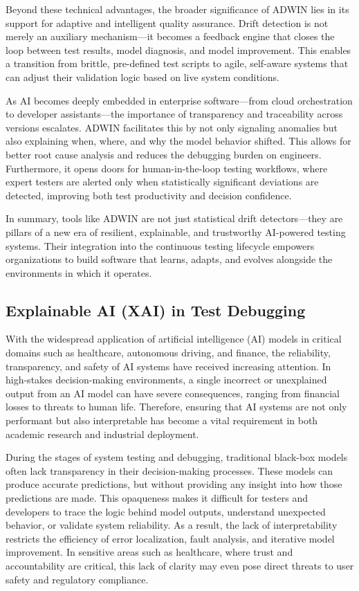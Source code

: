 \documentclass[manuscript,screen,review]{acmart}
\begin{document}
Beyond these technical advantages, the broader significance of ADWIN lies in its support for adaptive and intelligent quality assurance. Drift detection is not merely an auxiliary mechanism---it becomes a feedback engine that closes the loop between test results, model diagnosis, and model improvement. This enables a transition from brittle, pre-defined test scripts to agile, self-aware systems that can adjust their validation logic based on live system conditions.

As AI becomes deeply embedded in enterprise software---from cloud orchestration to developer assistants---the importance of transparency and traceability across versions escalates. ADWIN facilitates this by not only signaling anomalies but also explaining when, where, and why the model behavior shifted. This allows for better root cause analysis and reduces the debugging burden on engineers. Furthermore, it opens doors for human-in-the-loop testing workflows, where expert testers are alerted only when statistically significant deviations are detected, improving both test productivity and decision confidence.

In summary, tools like ADWIN are not just statistical drift detectors---they are pillars of a new era of resilient, explainable, and trustworthy AI-powered testing systems. Their integration into the continuous testing lifecycle empowers organizations to build software that learns, adapts, and evolves alongside the environments in which it operates.

\subsection{Explainable AI (XAI) in Test Debugging}
With the widespread application of artificial intelligence (AI) models in critical domains such as healthcare, autonomous driving, and finance, the reliability, transparency, and safety of AI systems have received increasing attention. In high-stakes decision-making environments, a single incorrect or unexplained output from an AI model can have severe consequences, ranging from financial losses to threats to human life. Therefore, ensuring that AI systems are not only performant but also interpretable has become a vital requirement in both academic research and industrial deployment.

During the stages of system testing and debugging, traditional black-box models often lack transparency in their decision-making processes. These models can produce accurate predictions, but without providing any insight into how those predictions are made. This opaqueness makes it difficult for testers and developers to trace the logic behind model outputs, understand unexpected behavior, or validate system reliability. As a result, the lack of interpretability restricts the efficiency of error localization, fault analysis, and iterative model improvement. In sensitive areas such as healthcare, where trust and accountability are critical, this lack of clarity may even pose direct threats to user safety and regulatory compliance.
\end{document}
